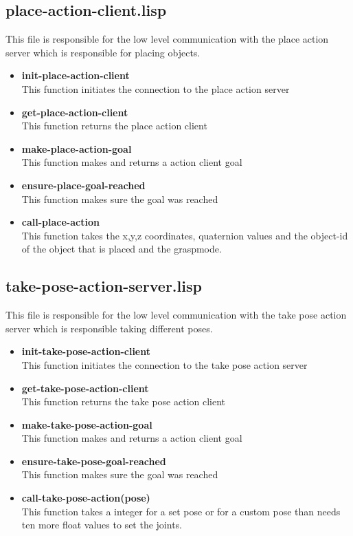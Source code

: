 \documentclass[main.tex]{subfiles}
\begin{document}
		\subsection{place-action-client.lisp}
		This file is responsible for the low level communication with the
		place action server which is responsible for placing objects.
	    \begin{itemize}
			\item \textbf{init-place-action-client} \\
			This function initiates the connection to the place action server
			\item \textbf{get-place-action-client} \\
			This function returns the place action client
			\item \textbf{make-place-action-goal} \\
			This function makes and returns a action client goal
			\item \textbf{ensure-place-goal-reached} \\
            This function makes sure the goal was reached
			\item \textbf{call-place-action} \\
			This function takes the x,y,z coordinates, quaternion values  and the object-id of the object that is placed and the graspmode.
		\end{itemize}
		\subsection{take-pose-action-server.lisp}
		This file is responsible for the low level communication with the
		take pose action server which is responsible taking different poses.
		\begin{itemize}
			\item \textbf{init-take-pose-action-client} \\
			This function initiates the connection to the take pose action server
			\item \textbf{get-take-pose-action-client} \\
			This function returns the take pose action client
			\item \textbf{make-take-pose-action-goal} \\
			This function makes and returns a action client goal
			\item \textbf{ensure-take-pose-goal-reached} \\
            This function makes sure the goal was reached
			\item \textbf{call-take-pose-action(pose)} \\
			This function takes a integer for a set pose or for a custom pose than needs ten more float values to set the joints.
		\end{itemize}
\end{document}
